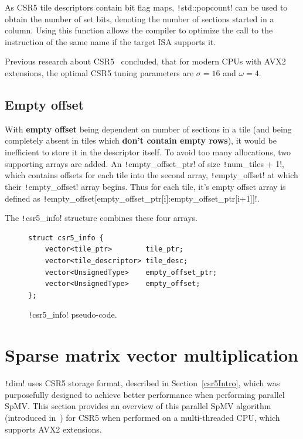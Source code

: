 \documentclass[thesis=M,english]{FITthesis}[2019/12/23]
\newcommand{\csre}[1]{\texttt!#1!}
\begin{document}
As CSR5 tile descriptors contain bit flag maps, \csre{std::popcount} can be used to obtain the number of set bits,
denoting the number of sections started in a column.
Using this function allows the compiler to optimize the call to the instruction of the same name
if the target ISA supports it.

Previous research about CSR5~\cite{liu2015csr5} concluded, that for modern CPUs with AVX2 extensions, the optimal CSR5 tuning parameters
are \(\sigma = 16\) and \(\omega = 4\).


\subsection{Empty offset}

With \textbf{empty offset} being dependent on number of sections in a tile (and being completely absent
in tiles which \textbf{don't contain empty rows}), it would be inefficient to
store it in the descriptor itself. To avoid too many allocations, two supporting arrays are added.
An \csre{empty_offset_ptr} of size \csre{num_tiles + 1}, which contains offsets for each tile into the
second array, \csre{empty_offset} at which their \csre{empty_offset} array begins.
Thus for each tile, it's empty offset array is defined as
\csre{empty_offset[empty_offset_ptr[i]:empty_offset_ptr[i+1]]}.

The \csre{csr5_info} structure combines these four arrays.


\begin{figure}[htp]
    \begin{verbatim}
struct csr5_info {
    vector<tile_ptr>        tile_ptr;
    vector<tile_descriptor> tile_desc;
    vector<UnsignedType>    empty_offset_ptr;
    vector<UnsignedType>    empty_offset;
};
    \end{verbatim}
    \caption{\csre{csr5_info} pseudo-code.}
\end{figure}

\vfil\pagebreak

\section{Sparse matrix vector multiplication}\label{csr5:spmv}


\csre{dim} uses CSR5 storage format, described in Section~\ref{csr5Intro}, which was purposefully
designed to achieve better performance when performing parallel SpMV\@. This section provides an overview
of this parallel SpMV algorithm (introduced in~\cite{liu2015csr5}) for CSR5 when performed on a multi-threaded
CPU, which supports AVX2 extensions.
\end{document}
